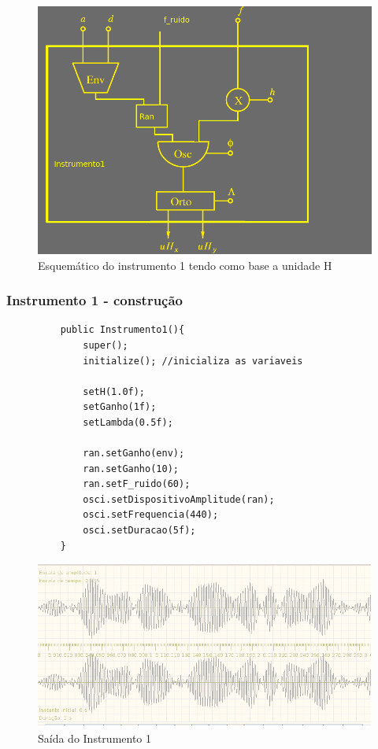 \documentclass{beamer}
\begin{document}
\begin{frame}
 \begin{figure}
  \includegraphics[scale=0.4]{./images/instrumento1.png}
  \caption{Esquemático do instrumento 1 tendo como base a unidade H}
 \end{figure} 
\end{frame}

 \begin{frame}[fragile]
 \frametitle{Instrumento 1 - construção}
 \begin{figure}
 	\centering
 	\begin{lstlisting}
	public Instrumento1(){
		super();
		initialize(); //inicializa as variaveis

		setH(1.0f);
		setGanho(1f);
		setLambda(0.5f);
		
		ran.setGanho(env);
		ran.setGanho(10);
		ran.setF_ruido(60);
		osci.setDispositivoAmplitude(ran);
		osci.setFrequencia(440);
		osci.setDuracao(5f);
	}
    			\end{lstlisting}
	\caption*{}	
	\end{figure}
\end{frame}

\begin{frame}
 \begin{figure}
  \includegraphics[scale=0.4]{./images/ins1.png}
  \caption{Saída do Instrumento 1}
 \end{figure} 
\end{frame}
\end{document}
